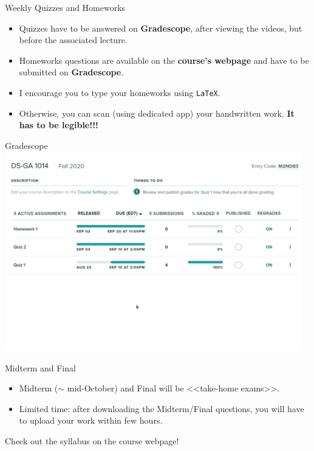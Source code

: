 \documentclass{beamer}
\begin{document}
\begin{frame}[t]{Weekly Quizzes and Homeworks}
	\begin{itemize}
		\item Quizzes have to be answered on \textbf{Gradescope}, after viewing the videos, but before the associated lecture.
			\vspace{0.3cm}
		\item Homeworks questions are available on the \textbf{course's webpage} and have to be submitted on \textbf{Gradescope}.
			\vspace{0.3cm}
			\pause
		\item I encourage you to type your homeworks using \texttt{LaTeX}.
			\vspace{0.3cm}
		\item Otherwise, you can scan (using dedicated app) your handwritten work.
			{\bf It has to be legible!!!}
	\end{itemize}
\end{frame}
\begin{frame}{Gradescope}
	\hspace*{-1.2cm}
	\includegraphics[width=12.9cm]{gradescope.png}
\end{frame}
\begin{frame}{Midterm and Final}
	\begin{itemize}
		\item Midterm ($\sim$ mid-October) and Final will be <<take-home exams>>.
			\vspace{0.3cm}
		\item Limited time: after downloading the Midterm/Final questions, you will have to upload your work within few hours.
	\end{itemize}
	\vspace{0.6cm}
	\begin{center}
		Check out the syllabus on the course webpage!
	\end{center}
\end{frame}
\end{document}
